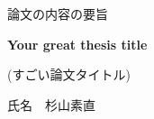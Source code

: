 \thispagestyle{empty}
\begin{center}
    \vspace*{10mm} %
    {\Large
        \begin{CJK}{UTF8}{ipxm}論文の内容の要旨\end{CJK}
    }\vspace{10mm}

    {\large\bf
        Your great thesis title\\\vspace{5mm}
    }
    {\large
        \begin{CJK}{UTF8}{ipxm}(すごい論文タイトル)\end{CJK}
    }\vspace{10mm}

    {\large
        \begin{CJK}{UTF8}{ipxm}氏名　杉山素直\end{CJK}
    }\vspace{10mm}
\end{center}
